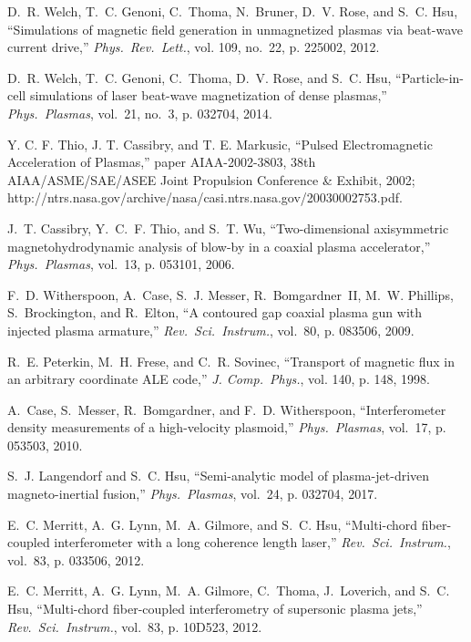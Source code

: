 \documentclass[journal]{IEEEtran}
\begin{document}
\begin{thebibliography}{10}
D.~R. Welch, T.~C. Genoni, C.~Thoma, N.~Bruner, D.~V. Rose, and S.~C. Hsu,
  ``Simulations of magnetic field generation in unmagnetized plasmas via
  beat-wave current drive,'' \emph{Phys.\ Rev.\ Lett.}, vol. 109, no.~22, p.
  225002, 2012.

D.~R. Welch, T.~C. Genoni, C.~Thoma, D.~V. Rose, and S.~C. Hsu,
  ``Particle-in-cell simulations of laser beat-wave magnetization of dense
  plasmas,'' \emph{Phys.\ Plasmas}, vol.~21, no.~3, p. 032704, 2014.

Y. C. F. Thio, J. T. Cassibry, and T. E. Markusic, ``Pulsed Electromagnetic
  Acceleration of Plasmas,'' paper AIAA-2002-3803, 38th AIAA/ASME/SAE/ASEE
  Joint Propulsion Conference \& Exhibit, 2002;
  http://ntrs.nasa.gov/archive/nasa/casi.ntrs.nasa.gov/20030002753.pdf.

J.~T. Cassibry, Y.~C.~F. Thio, and S.~T. Wu, ``Two-dimensional axisymmetric
  magnetohydrodynamic analysis of blow-by in a coaxial plasma accelerator,''
  \emph{Phys.\ Plasmas}, vol.~13, p. 053101, 2006.

F.~D. Witherspoon, A.~Case, S.~J. Messer, R.~\mbox{Bomgardner~II}, M.~W.
  Phillips, S.~Brockington, and R.~Elton, ``A contoured gap coaxial plasma gun
  with injected plasma armature,'' \emph{Rev.\ Sci.\ Instrum.}, vol.~80, p.
  083506, 2009.

R.~E. Peterkin, M.~H. Frese, and C.~R. Sovinec, ``Transport of magnetic flux in
  an arbitrary coordinate \mbox{ALE} code,'' \emph{J. Comp.\ Phys.}, vol. 140,
  p. 148, 1998.

A.~Case, S.~Messer, R.~Bomgardner, and F.~D. Witherspoon, ``Interferometer
  density measurements of a high-velocity plasmoid,'' \emph{Phys.\ Plasmas},
  vol.~17, p. 053503, 2010.

S.~J. Langendorf and S.~C. Hsu, ``Semi-analytic model of plasma-jet-driven
  magneto-inertial fusion,'' \emph{Phys.\ Plasmas}, vol.~24, p. 032704, 2017.

E.~C. Merritt, A.~G. Lynn, M.~A. Gilmore, and S.~C. Hsu, ``Multi-chord
  fiber-coupled interferometer with a long coherence length laser,''
  \emph{Rev.\ Sci.\ Instrum.}, vol.~83, p. 033506, 2012.

E.~C. Merritt, A.~G. Lynn, M.~A. Gilmore, C.~Thoma, J.~Loverich, and S.~C. Hsu,
  ``Multi-chord fiber-coupled interferometry of supersonic plasma jets,''
  \emph{Rev.\ Sci.\ Instrum.}, vol.~83, p. 10D523, 2012.


\end{thebibliography}
\end{document}

